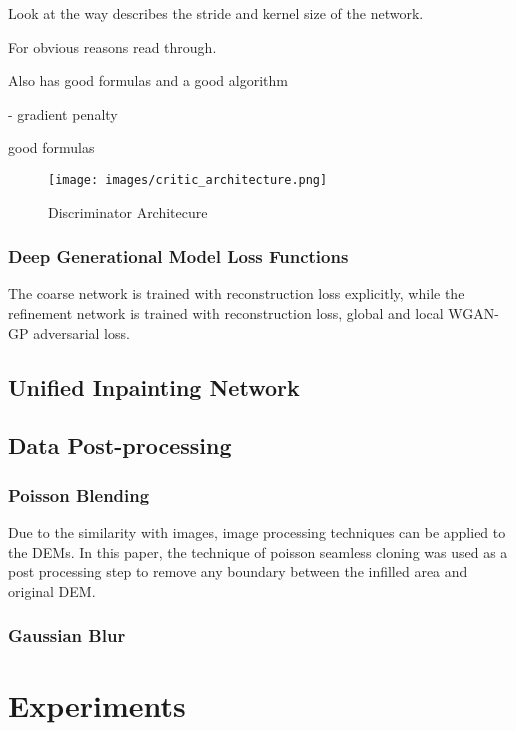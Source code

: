 \documentclass[twocolumn]{article}
\begin{document}
Look at the way\autocite{zhangVoidFillingBased2020} describes the stride and kernel size of the network.

For obvious reasons read through\autocite{yuGenerativeImageInpainting2018}.

Also has good formulas and a good algorithm

\autocite{gulrajaniImprovedTrainingWasserstein2017} - gradient penalty

\autocite{qiuVoidFillingDigital2019} good formulas



\begin{figure}[htbp]
\centering
\texttt{[image: images/critic\_architecture.png]}
\caption{\label{fig:discriminator}Discriminator Architecure}
\end{figure}

\subsubsection{Deep Generational Model Loss Functions}
\label{sec:org40a4095}
The coarse network is trained with reconstruction loss explicitly, while the refinement network is trained with reconstruction loss, global and local WGAN-GP adversarial loss.\autocite{yuGenerativeImageInpainting2018}
\subsection{Unified Inpainting Network}
\label{sec:org6a8ae1e}
\subsection{Data Post-processing}
\label{sec:org33dd0d8}
\subsubsection{Poisson Blending}
\label{sec:orgc79be57}
Due to the similarity with images, image processing techniques can be applied to the DEMs.
In this paper, the technique of poisson seamless cloning\autocite{perezPoissonImageEditing2003} was used as a post processing step to remove any boundary between the infilled area and original DEM.

\subsubsection{Gaussian Blur}
\label{sec:orgd151851}


\section{Experiments}
\label{sec:orge84743f}
\end{document}
